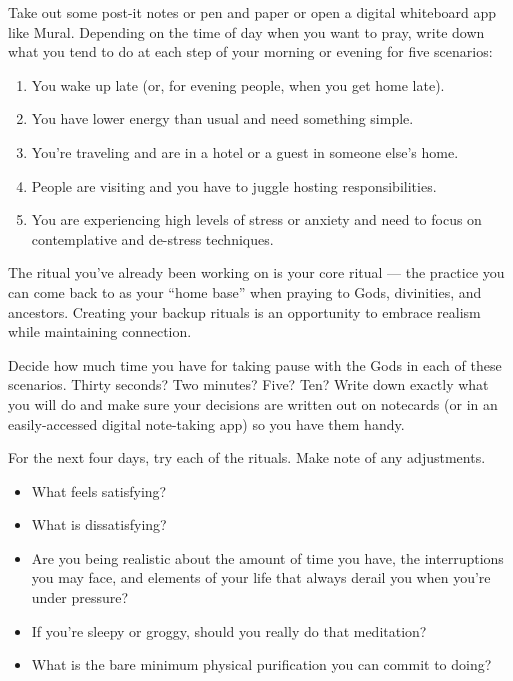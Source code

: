 \documentclass[
]{book}
\providecommand{\tightlist}{%
  \setlength{\itemsep}{0pt}\setlength{\parskip}{0pt}}
\begin{document}
Take out some post-it notes or pen and paper or open a digital whiteboard app like Mural. Depending on the time of day when you want to pray, write down what you tend to do at each step of your morning or evening for five scenarios:

\begin{enumerate}
\def\labelenumi{\arabic{enumi}.}
\tightlist
\item
  You wake up late (or, for evening people, when you get home late).
\item
  You have lower energy than usual and need something simple.
\item
  You're traveling and are in a hotel or a guest in someone else's home.
\item
  People are visiting and you have to juggle hosting responsibilities.
\item
  You are experiencing high levels of stress or anxiety and need to focus on contemplative and de-stress techniques.
\end{enumerate}

The ritual you've already been working on is your core ritual --- the practice you can come back to as your ``home base'' when praying to Gods, divinities, and ancestors. Creating your backup rituals is an opportunity to embrace realism while maintaining connection.

Decide how much time you have for taking pause with the Gods in each of these scenarios. Thirty seconds? Two minutes? Five? Ten? Write down exactly what you will do and make sure your decisions are written out on notecards (or in an easily-accessed digital note-taking app) so you have them handy.

For the next four days, try each of the rituals. Make note of any adjustments.

\begin{itemize}
\tightlist
\item
  What feels satisfying?
\item
  What is dissatisfying?
\item
  Are you being realistic about the amount of time you have, the interruptions you may face, and elements of your life that always derail you when you're under pressure?
\item
  If you're sleepy or groggy, should you really do that meditation?
\item
  What is the bare minimum physical purification you can commit to doing?
\end{itemize}
\end{document}
